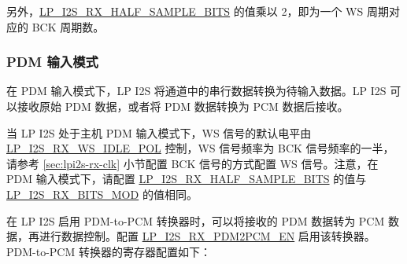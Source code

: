 \documentclass[main\_\_CN.tex]{subfiles}
\begin{document}
另外，\hyperref[fielddesc:LPI2SRXHALFSAMPLEBITS]{LP\_I2S\_RX\_HALF\_SAMPLE\_BITS} 的值乘以 2，即为一个 WS 周期对应的 BCK 周期数。

\subsubsection{PDM 输入模式} 

在 PDM 输入模式下，LP I2S 将通道中的串行数据转换为待输入数据。LP I2S 可以接收原始 PDM 数据，或者将 PDM 数据转换为 PCM 数据后接收。

当 LP I2S 处于主机 PDM 输入模式下，WS 信号的默认电平由 \hyperref[fielddesc:LPI2SRXWSIDLEPOL]{LP\_I2S\_RX\_WS\_IDLE\_POL} 控制，WS 信号频率为 BCK 信号频率的一半，请参考 \ref{sec:lpi2s-rx-clk} 小节配置 BCK 信号的方式配置 WS 信号。注意，在 PDM 输入模式下，请配置 \hyperref[fielddesc:LPI2SRXHALFSAMPLEBITS]{LP\_I2S\_RX\_HALF\_SAMPLE\_BITS} 的值与 \hyperref[fielddesc:LPI2SRXBITSMOD]{LP\_I2S\_RX\_BITS\_MOD} 的值相同。

在 LP I2S 启用 PDM-to-PCM 转换器时，可以将接收的 PDM 数据转为 PCM 数据，再进行数据控制。配置 \hyperref[fielddesc:LPI2SRXPDM2PCMEN]{LP\_I2S\_RX\_PDM2PCM\_EN} 启用该转换器。PDM-to-PCM 转换器的寄存器配置如下：
\end{document}
